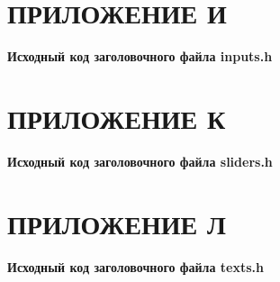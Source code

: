 \documentclass[14pt]{extarticle}
\begin{document}
{
    {
        \par
        \centering\section{ПРИЛОЖЕНИЕ И}
        \par
    }
    \par
    {
        \par
        \centering
        \textbf{
            Исходный код заголовочного файла inputs.h
        }
        \par
    }
    \par
    \vspace{1em}

    

    \par
    \vfill
    \newpage
}

{
    {
        \par
        \centering\section{ПРИЛОЖЕНИЕ К}
        \par
    }
    \par
    {
        \par
        \centering
        \textbf{
            Исходный код заголовочного файла sliders.h
        }
        \par
    }
    \par
    \vspace{1em}

    

    \par
    \vfill
    \newpage
}

{
    {
        \par
        \centering\section{ПРИЛОЖЕНИЕ Л}
        \par
    }
    \par
    {
        \par
        \centering
        \textbf{
            Исходный код заголовочного файла texts.h
        }
        \par
    }
    \par
    \vspace{1em}

    

    \par
    \vfill
    \newpage
}
\end{document}

